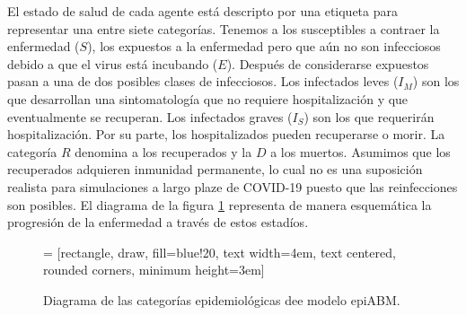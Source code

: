 El estado de salud de cada agente está descripto por una etiqueta para representar una entre siete categorías. Tenemos a los susceptibles a contraer la enfermedad ($S$), los expuestos a la enfermedad pero que aún no son infecciosos debido a que el virus está incubando ($E$). Después de considerarse expuestos pasan a una de dos posibles clases de infecciosos. Los infectados leves ($I_M$) son los que desarrollan una sintomatología que no requiere hospitalización y que eventualmente se recuperan. Los infectados graves ($I_S$) son los que requerirán hospitalización. Por su parte, los hospitalizados pueden recuperarse o morir. La categoría $R$ denomina a los recuperados y la $D$ a los muertos. Asumimos que los recuperados adquieren inmunidad permanente, lo cual no es una suposición realista para simulaciones a largo plaze de COVID-19 puesto que las reinfecciones son posibles. El diagrama de la figura \ref{dia:epi_abm} representa de manera esquemática la progresión de la enfermedad a través de estos estadíos.

\begin{figure}
    \begin{center}
         = [rectangle, draw, fill=blue!20, 
        text width=4em, text centered, rounded corners, minimum height=3em]
        \centering
    \end{center}
    \caption{Diagrama de las categorías epidemiológicas dee modelo epiABM.}
    \label{dia:epi_abm}
\end{figure}

